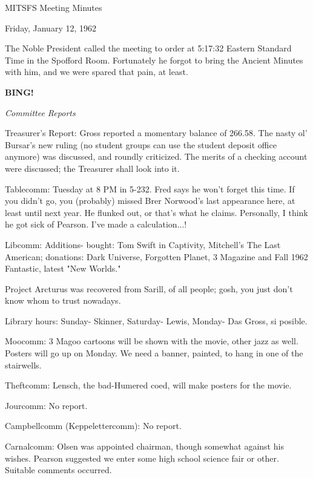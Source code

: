 \documentclass[12pt]{article}
\newcommand{\bing}{{\bf BING!} }
\newcommand{\goto}[1]{\bing \vskip 12pt \centerline{{\em{#1}}}}
\begin{document}
\begin{center}

MITSFS Meeting Minutes

Friday, January 12, 1962

\end{center}
 
\vspace{12pt}

\setlength{\parskip}{6pt}

\noindent
The Noble President called the meeting to order at 5:17:32 Eastern Standard Time in the Spofford Room. Fortunately he forgot to bring the Ancient Minutes with him, and we were spared that pain, at least.

\goto{Committee Reports}

Treasurer's Report: Gross reported a momentary balance of 266.58. The nasty ol' Bursar's new ruling (no student groups can use the student deposit office anymore) was discussed, and roundly criticized. The merits of a checking account were discussed; the Treasurer shall look into it.

Tablecomm: Tuesday at 8 PM in 5-232. Fred says he won't forget this time. If you didn't go, you (probably) missed Brer Norwood's last appearance here, at least until next year. He flunked out, or that's what he claims. Personally, I think he got sick of Pearson. I've made a calculation...!

Libcomm: Additions- bought: Tom Swift in Captivity, Mitchell's The Last American; donations: Dark Universe, Forgotten Planet, 3 Magazine and Fall 1962 Fantastic, latest "New Worlds."

Project Arcturus was recovered from Sarill, of all people; gosh, you just don't know whom to trust nowadays.

Library hours: Sunday- Skinner, Saturday- Lewis, Monday- Das Gross, si posible.

Moocomm: 3 Magoo cartoons will be shown with the movie, other jazz as well. Posters will go up on Monday. We need a banner, painted, to hang in one of the stairwells.

Theftcomm: Lensch, the bad-Humered coed, will make posters for the movie.

Jourcomm: No report.

Campbellcomm (Keppelettercomm): No report.

Carnalcomm: Olsen was appointed chairman, though somewhat against his wishes. Pearson suggested we enter some high school science fair or other. Suitable comments occurred.
\end{document}

